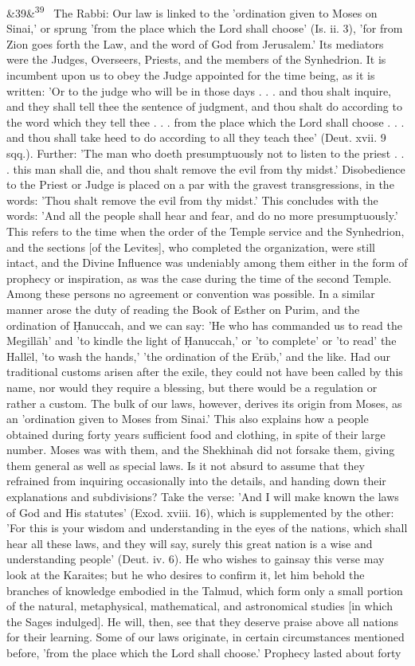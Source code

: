 \documentclass[12pt]{article}
\newcommand{\para}[1][]{\par\noindent\ifx&#1&\else\textsuperscript{\footnotesize #1}~\fi}
\begin{document}
\para[39] The Rabbi: Our law is linked to the 'ordination given to Moses on Sinai,' or sprung 'from the place which the Lord shall choose' (Is. ii. 3), 'for from Zion goes forth the Law, and the word of God from Jerusalem.' Its mediators were the Judges, Overseers, Priests, and the members of the Synhedrion. It is incumbent upon us to obey the Judge appointed for the time being, as it is written: 'Or to the judge who will be in those days . . . and thou shalt inquire, and they shall tell thee the sentence of judgment, and thou shalt do according to the word which they tell thee . . . from the place which the Lord shall choose . . . and thou shall take heed to do according to all they teach thee' (Deut. xvii. 9 sqq.). Further: 'The man who doeth presumptuously not to listen to the priest . . . this man shall die, and thou shalt remove the evil from thy midst.' Disobedience to the Priest or Judge is placed on a par with the gravest transgressions, in the words: 'Thou shalt remove the evil from thy midst.' This concludes with the words: 'And all the people shall hear and fear, and do no more presumptuously.' This refers to the time when the order of the Temple service and the Synhedrion, and the sections [of the Levites], who completed the organization, were still intact, and the Divine Influence was undeniably among them either in the form of prophecy or inspiration, as was the case during the time of the second Temple. Among these persons no agreement or convention was possible. In a similar manner arose the duty of reading the Book of Esther on Purim, and the ordination of Ḥanuccah, and we can say: 'He who has commanded us to read the Megillāh' and 'to kindle the light of Ḥanuccah,' or 'to complete' or 'to read' the Hallēl, 'to wash the hands,' 'the ordination of the Erūb,' and the like. Had our traditional customs arisen after the exile, they could not have been called by this name, nor would they require a blessing, but there would be a regulation or rather a custom. The bulk of our laws, however, derives its origin from Moses, as an 'ordination given to Moses from Sinai.' This also explains how a people obtained during forty years sufficient food and clothing, in spite of their large number. Moses was with them, and the Shekhinah did not forsake them, giving them general as well as special laws. Is it not absurd to assume that they refrained from inquiring occasionally into the details, and handing down their explanations and subdivisions? Take the verse: 'And I will make known the laws of God and His statutes' (Exod. xviii. 16), which is supplemented by the other: 'For this is your wisdom and understanding in the eyes of the nations, which shall hear all these laws, and they will say, surely this great nation is a wise and understanding people' (Deut. iv. 6). He who wishes to gainsay this verse may look at the Karaites; but he who desires to confirm it, let him behold the branches of knowledge embodied in the Talmud, which form only a small portion of the natural, metaphysical, mathematical, and astronomical studies [in which the Sages indulged]. He will, then, see that they deserve praise above all nations for their learning. Some of our laws originate, in certain circumstances mentioned before, 'from the place which the Lord shall choose.' Prophecy lasted about forty 
\end{document}
